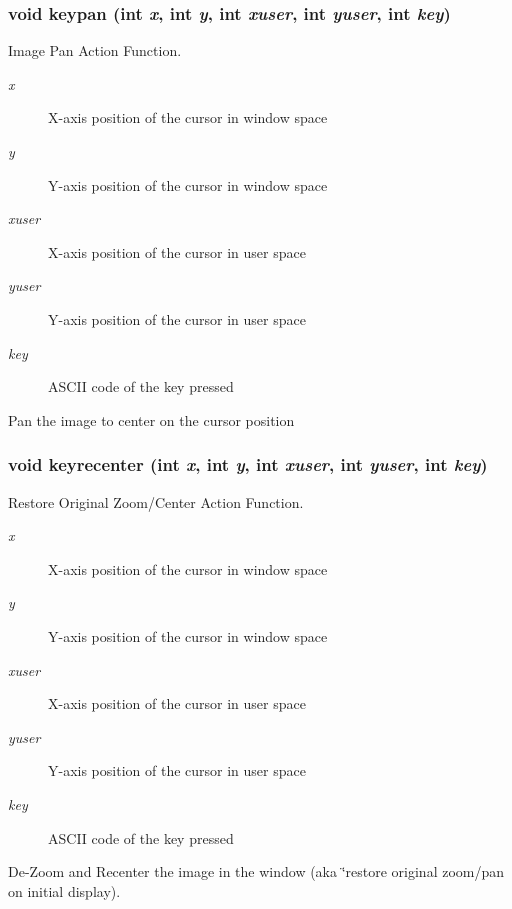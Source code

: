 \subsubsection{\setlength{\rightskip}{0pt plus 5cm}void keypan (int {\em x}, int {\em y}, int {\em xuser}, int {\em yuser}, int {\em key})}\label{xtvutils_8c_a212}


Image Pan Action Function. 

\begin{Desc}
\item[Parameters:]
\begin{description}
\item[{\em x}]X-axis position of the cursor in window space \item[{\em y}]Y-axis position of the cursor in window space \item[{\em xuser}]X-axis position of the cursor in user space \item[{\em yuser}]Y-axis position of the cursor in user space \item[{\em key}]ASCII code of the key pressed\end{description}
\end{Desc}
Pan the image to center on the cursor position 
\subsubsection{\setlength{\rightskip}{0pt plus 5cm}void keyrecenter (int {\em x}, int {\em y}, int {\em xuser}, int {\em yuser}, int {\em key})}\label{xtvutils_8c_a213}


Restore Original Zoom/Center Action Function. 

\begin{Desc}
\item[Parameters:]
\begin{description}
\item[{\em x}]X-axis position of the cursor in window space \item[{\em y}]Y-axis position of the cursor in window space \item[{\em xuser}]X-axis position of the cursor in user space \item[{\em yuser}]Y-axis position of the cursor in user space \item[{\em key}]ASCII code of the key pressed\end{description}
\end{Desc}
De-Zoom and Recenter the image in the window (aka \char`\"{}restore original zoom/pan on initial display). 
